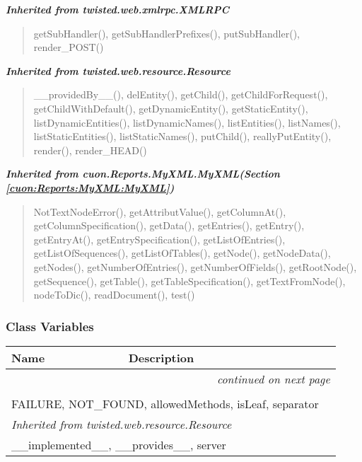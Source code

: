 \large{\textbf{\textit{Inherited from twisted.web.xmlrpc.XMLRPC}}}

\begin{quote}
getSubHandler(), getSubHandlerPrefixes(), putSubHandler(), render\_POST()
\end{quote}

\large{\textbf{\textit{Inherited from twisted.web.resource.Resource}}}

\begin{quote}
\_\_providedBy\_\_(), delEntity(), getChild(), getChildForRequest(), getChildWithDefault(), getDynamicEntity(), getStaticEntity(), listDynamicEntities(), listDynamicNames(), listEntities(), listNames(), listStaticEntities(), listStaticNames(), putChild(), reallyPutEntity(), render(), render\_HEAD()
\end{quote}

\large{\textbf{\textit{Inherited from cuon.Reports.MyXML.MyXML\textit{(Section \ref{cuon:Reports:MyXML:MyXML})}}}}

\begin{quote}
NotTextNodeError(), getAttributValue(), getColumnAt(), getColumnSpecification(), getData(), getEntries(), getEntry(), getEntryAt(), getEntrySpecification(), getListOfEntries(), getListOfSequences(), getListOfTables(), getNode(), getNodeData(), getNodes(), getNumberOfEntries(), getNumberOfFields(), getRootNode(), getSequence(), getTable(), getTableSpecification(), getTextFromNode(), nodeToDic(), readDocument(), test()
\end{quote}


  \subsubsection{Class Variables}

    \vspace{-1cm}
\hspace{\varindent}\begin{longtable}{|p{\varnamewidth}|p{\vardescrwidth}|l}
\cline{1-2}
\cline{1-2} \centering \textbf{Name} & \centering \textbf{Description}& \\
\cline{1-2}
\endhead\cline{1-2}\multicolumn{3}{r}{\small\textit{continued on next page}}\\\endfoot\cline{1-2}
\endlastfoot\multicolumn{2}{|l|}{\textit{Inherited from twisted.web.xmlrpc.XMLRPC}}\\
\multicolumn{2}{|p{\varwidth}|}{\raggedright FAILURE, NOT\_FOUND, allowedMethods, isLeaf, separator}\\
\cline{1-2}
\multicolumn{2}{|l|}{\textit{Inherited from twisted.web.resource.Resource}}\\
\multicolumn{2}{|p{\varwidth}|}{\raggedright \_\_implemented\_\_, \_\_provides\_\_, server}\\
\cline{1-2}
\end{longtable}

